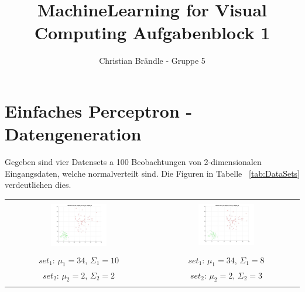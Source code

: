 \documentclass[]{report}
\title{MachineLearning for Visual Computing Aufgabenblock 1}
\author{Christian Br\"andle - Gruppe 5}
\begin{document}
\maketitle


\section{Einfaches Perceptron - Datengeneration}

Gegeben sind vier Datensets a 100 Beobachtungen von 2-dimensionalen Eingangsdaten, welche normalverteilt sind. Die Figuren in Tabelle ~\ref{tab:DataSets} verdeutlichen dies.


\begin{table}[h]
\begin{tabular}{| c | c |}
\hline
 & \\
\includegraphics[width=0.4\textwidth]{./images/DataSet_100.jpg} & \includegraphics[width=0.4\textwidth]{./images/DataSet_200.jpg} \\
 & \\
 $set_{1}$: $\mu_1=34$, $\Sigma_1=10$ & $set_{1}$: $\mu_1=34$, $\Sigma_1=8$ \\
 $set_{2}$: $\mu_2=2$, $\Sigma_2=2$ & $set_{2}$: $\mu_2=2$, $\Sigma_2=3$ \\
\hline
 & \\

\end{tabular}
\end{table}
\end{document}

